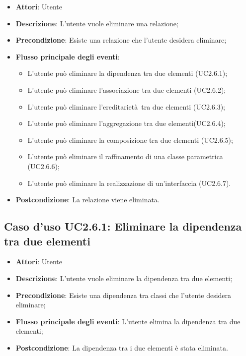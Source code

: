 \documentclass[../AnalisiDeiRequisiti.tex]{subfiles}
\begin{document}
		\begin{itemize}
			\item \textbf{Attori}: Utente
			\item \textbf{Descrizione}: L'utente vuole eliminare una relazione;
			\item \textbf{Precondizione}: Esiste una relazione che l'utente desidera eliminare;
			\item \textbf{Flusso principale degli eventi}: \begin{itemize}
				\item L'utente può eliminare la dipendenza tra due elementi (UC2.6.1);
				\item L'utente può eliminare l'associazione tra due elementi (UC2.6.2);
				\item L'utente può eliminare l'ereditarietà tra due elementi (UC2.6.3);
				\item L'utente può eliminare l'aggregazione tra due elementi(UC2.6.4);
				\item L'utente può eliminare la composizione tra due elementi (UC2.6.5);
				\item L'utente può eliminare il raffinamento di una classe parametrica (UC2.6.6);
				\item L'utente può eliminare la realizzazione di un'interfaccia (UC2.6.7).
			\end{itemize}
			\item \textbf{Postcondizione}: La relazione viene eliminata.
		\end{itemize}
		\subsection{Caso d'uso UC2.6.1: Eliminare la dipendenza tra due elementi }
		\begin{itemize}
			\item \textbf{Attori}: Utente
			\item \textbf{Descrizione}: L'utente vuole eliminare la dipendenza tra due elementi;
			\item \textbf{Precondizione}: Esiste una dipendenza tra classi che l'utente desidera eliminare;
			\item \textbf{Flusso principale degli eventi}: L'utente elimina la dipendenza tra due elementi;
			\item \textbf{Postcondizione}: La dipendenza tra i due elementi è stata eliminata.
		\end{itemize}
\end{document}
